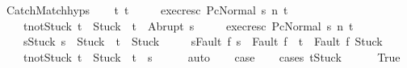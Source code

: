 \begin{isabellebody}
\ CatchMatch{\isachardot}hyps\isanewline
\ \ \isamarkupfalse%
\ t{\isacharprime}\ t{\isacharprime}{\isacharprime}\ \isanewline
\ \ \ \ exec{\isacharunderscore}res{\isacharunderscore}c{}{\isacharcolon}\ {\isachardoublequoteopen}{\isasymGamma}{\isacharbar}\isactrlbsub P\isactrlesub {\isasymturnstile}{\isasymlangle}c{}{\isacharcomma}Normal\ s{\isasymrangle}\ {\isacharequal}n{\isasymRightarrow}\ t{\isacharprime}{\isachardoublequoteclose}\ \isanewline
\ \ \ \ t{\isacharprime}{\isacharunderscore}notStuck{\isacharcolon}\ {\isachardoublequoteopen}t{\isacharprime}\ {\isasymnoteq}\ Stuck\ {\isasymlongrightarrow}\ t{\isacharprime}\ {\isacharequal}\ Abrupt\ s{\isacharprime}{\isachardoublequoteclose}\ \isanewline
\ \ \ \ exec{\isacharunderscore}res{\isacharunderscore}c{}{\isacharcolon}\ {\isachardoublequoteopen}{\isasymGamma}{\isacharbar}\isactrlbsub P\isactrlesub {\isasymturnstile}{\isasymlangle}c{}{\isacharcomma}Normal\ s{\isacharprime}{\isasymrangle}\ {\isacharequal}n{\isasymRightarrow}\ t{\isacharprime}{\isacharprime}{\isachardoublequoteclose}\ \isanewline
\ \ \ \ s{\isacharprime}{\isacharprime}{\isacharunderscore}Stuck{\isacharcolon}\ {\isachardoublequoteopen}s{\isacharprime}{\isacharprime}\ {\isacharequal}\ Stuck\ {\isasymlongrightarrow}\ t{\isacharprime}{\isacharprime}\ {\isacharequal}\ Stuck{\isachardoublequoteclose}\ \isanewline
\ \ \ \ s{\isacharprime}{\isacharprime}{\isacharunderscore}Fault{\isacharcolon}\ {\isachardoublequoteopen}{\isasymforall}f{\isachardot}\ s{\isacharprime}{\isacharprime}\ {\isacharequal}\ Fault\ f\ {\isasymlongrightarrow}\ t{\isacharprime}{\isacharprime}\ {\isasymin}\ {\isacharbraceleft}Fault\ f{\isacharcomma}\ Stuck{\isacharbraceright}{\isachardoublequoteclose}\ \ \isanewline
\ \ \ \ t{\isacharprime}{\isacharprime}{\isacharunderscore}notStuck{\isacharcolon}\ {\isachardoublequoteopen}t{\isacharprime}{\isacharprime}\ {\isasymnoteq}\ Stuck\ {\isasymlongrightarrow}\ t{\isacharprime}{\isacharprime}\ {\isacharequal}\ s{\isacharprime}{\isacharprime}{\isachardoublequoteclose}\isanewline
\ \ \ \ \isamarkupfalse%
\ auto\isanewline
\ \ \isamarkupfalse%
\ {\isacharquery}case\isanewline
\ \ \isamarkupfalse%
\ {\isacharparenleft}cases\ {\isachardoublequoteopen}t{\isacharprime}{\isacharequal}Stuck{\isachardoublequoteclose}{\isacharparenright}\isanewline
\ \ \ \ \isamarkupfalse%
\ True\isanewline
\ \ \ \ \isamarkupfalse%

\end{isabellebody}

